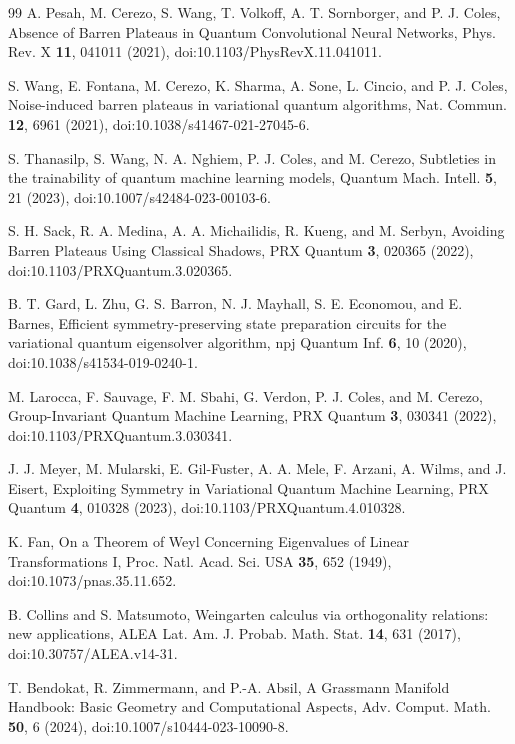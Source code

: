 \documentclass[aps,prx,reprint,superscriptaddress,nofootinbib,longbibliography]{revtex4-2}
\begin{document}
\begin{thebibliography}{99}
A. Pesah, M. Cerezo, S. Wang, T. Volkoff, A. T. Sornborger, and P. J. Coles,
Absence of Barren Plateaus in Quantum Convolutional Neural Networks,
Phys. Rev. X \textbf{11}, 041011 (2021),
doi:10.1103/PhysRevX.11.041011.

S. Wang, E. Fontana, M. Cerezo, K. Sharma, A. Sone, L. Cincio, and P. J. Coles,
Noise-induced barren plateaus in variational quantum algorithms,
Nat. Commun. \textbf{12}, 6961 (2021),
doi:10.1038/s41467-021-27045-6.

S. Thanasilp, S. Wang, N. A. Nghiem, P. J. Coles, and M. Cerezo,
Subtleties in the trainability of quantum machine learning models,
Quantum Mach. Intell. \textbf{5}, 21 (2023),
doi:10.1007/s42484-023-00103-6.

S. H. Sack, R. A. Medina, A. A. Michailidis, R. Kueng, and M. Serbyn,
Avoiding Barren Plateaus Using Classical Shadows,
PRX Quantum \textbf{3}, 020365 (2022),
doi:10.1103/PRXQuantum.3.020365.

B. T. Gard, L. Zhu, G. S. Barron, N. J. Mayhall, S. E. Economou, and E. Barnes,
Efficient symmetry-preserving state preparation circuits for the variational quantum eigensolver algorithm,
npj Quantum Inf. \textbf{6}, 10 (2020),
doi:10.1038/s41534-019-0240-1.

M. Larocca, F. Sauvage, F. M. Sbahi, G. Verdon, P. J. Coles, and M. Cerezo,
Group-Invariant Quantum Machine Learning,
PRX Quantum \textbf{3}, 030341 (2022),
doi:10.1103/PRXQuantum.3.030341.

J. J. Meyer, M. Mularski, E. Gil-Fuster, A. A. Mele, F. Arzani, A. Wilms, and J. Eisert,
Exploiting Symmetry in Variational Quantum Machine Learning,
PRX Quantum \textbf{4}, 010328 (2023),
doi:10.1103/PRXQuantum.4.010328.

K. Fan,
On a Theorem of Weyl Concerning Eigenvalues of Linear Transformations I,
Proc. Natl. Acad. Sci. USA \textbf{35}, 652 (1949),
doi:10.1073/pnas.35.11.652.

B. Collins and S. Matsumoto,
Weingarten calculus via orthogonality relations: new applications,
ALEA Lat. Am. J. Probab. Math. Stat. \textbf{14}, 631 (2017),
doi:10.30757/ALEA.v14-31.

T. Bendokat, R. Zimmermann, and P.-A. Absil,
A Grassmann Manifold Handbook: Basic Geometry and Computational Aspects,
Adv. Comput. Math. \textbf{50}, 6 (2024),
doi:10.1007/s10444-023-10090-8.



\end{thebibliography}
\end{document}
